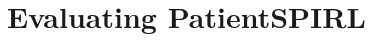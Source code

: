 \chapter{Evaluating PatientSPIRL}
\label{ch:eval}

\begin{comment}
\section{Selecting the simulator}

\begin{table}[]
    \centering
    \begin{tabular}{c|c|c|c}
         Simulator & $\mathcal{O} $ & $\mathcal{A}$ & $\prob_r(r=0|s) \neq 1$ \\
         \midrule
         simglucose & $[0;+\infty)$ & $[0;35]$ & $S_{nt} \cup S_t$ \\
         GYMIC & $[0;24]^{46}$ & $0,\dots,24$ & $S_{nt} \cup S_t$ \\
         Virtu-ALS & $[0;256]^{307200}$ & $1,\dots,307200$ & $S_{nt} \cup S_t$ \\
         Auto-ALS & $[0;+\infty)^{36}$ & $1,\dots,34$ & $S_{nt} \cup S_t$ \\
         HeartPole & $\mathcal{R}^6$ & $1,\dots,4$ & $S_{nt} \cup S_t$ \\
         GraphSim & $(-\infty;+\infty)^{26}$ & $[0;1]^{317}$ & $S_t$ \\
    \end{tabular}
    \caption{Summary of each simulator: POMDP view}
    \label{tab:structview}
\end{table}

\begin{table*}[]
    \centering
    \begin{tabular}{c|c|c|c|c|c}
         Simulator & Scope & data source & sample size & learning algorithm & known biases \\
         \midrule
         simglucose \cite{simglucose} & type 1 diabetes & original study & 32 & expert model validated on data & \\
         GYMIC \cite{gym-sepsis} & sepsis in intensive care & MIMIC \cite{johnsonMIMICIVFreelyAccessible2023} & 40000 & behavior cloning & overfitting \\
         Virtu-ALS \cite{briskAIEnhanceInteractive2018} & emergency care & & & & confirmation bias \\
         Auto-ALS & emergency care & & & & confirmation bias \\
         HeartPole & healthy lifestyle & & & & no factual basis \\
    \end{tabular}
    \caption{Summary of each simulator: trust view}
    \label{tab:trustview}
\end{table*}


\end{comment}
